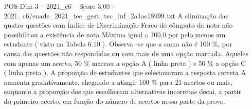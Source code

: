 \begin{textsample}{POS Dim 3 – 2021\_c6 – Score 3.00 – 2021\_c6/enade\_2021\_tec\_gest\_tec\_inf\_2a1ac18999.txt}
A eliminação das quatro questões com Índice de Discriminação Fraco do cômputo da nota não possibilitou a existência de nota Máxima igual a 100,0 por pelo menos um estudante ( visto na Tabela 6.10 ).
Observa -se que a soma não é 100 \%, por causa das questões não respondidas ou com mais de uma opção marcada.
Aqueles com apenas um acerto, 50 \% marcou a opção A ( linha preta ) e 50 \% a opção C ( linha preta ).
A proporção de estudantes que selecionaram a resposta correta A aumenta gradativamente, chegando a atingir 100 \% para 21 acertos ou mais, enquanto a proporção dos que escolheram alternativas incorretas decai, a partir do primeiro acerto, em função do número de acertos nessa parte da prova.

\end{textsample}
